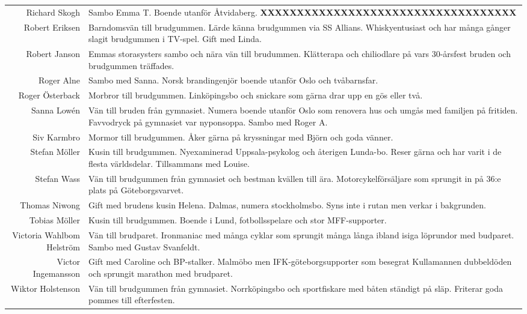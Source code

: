 \documentclass[a5paper]{article}
\begin{document}
\begin{longtable}[l]{N|L}
				Richard Skogh	&	Sambo Emma T. Boende utanför Åtvidaberg.  \textbf{XXXXXXXXXXXXXXXXXXXXXXXXXXXXXXXXXXX}	\\
				Robert Eriksen	&	Barndomsvän till brudgummen. Lärde känna brudgummen via SS Allians. Whiskyentusiast och har många gånger slagit brudgummen i TV-spel. Gift med Linda. 	\\
				Robert Janson	&	Emmas storasysters sambo och nära vän till brudummen. Klätterapa och chiliodlare på vars 30-årsfest bruden och brudgummen träffades.	\\
				Roger Alne	&	Sambo med Sanna. Norsk brandingenjör boende utanför Oslo och tvåbarnsfar.	\\
				Roger Österback	&	Morbror till brudgummen. Linköpingsbo och snickare som gärna drar upp en gös eller två.	\\
				Sanna Lowén	&	Vän till bruden från gymnasiet. Numera boende utanför Oslo som renovera hus och umgås med familjen på fritiden. Favvodryck på gymnasiet var nyponsoppa. Sambo med Roger A.	\\
				Siv Karmbro	&	Mormor till brudgummen. Åker gärna på kryssningar med Björn och goda vänner.	\\
				Stefan Möller	&	Kusin till brudgummen. Nyexaminerad Uppsala-psykolog och återigen Lunda-bo. Reser gärna och har varit i de flesta världsdelar. Tillsammans med Louise.	\\
				Stefan Wass	&	Vän till brudgummen från gymnasiet och bestman kvällen till ära. Motorcykelförsäljare som sprungit in på 36:e plats på Göteborgsvarvet.	\\
				Thomas Niwong	&	Gift med brudens kusin Helena. Dalmas, numera stockholmsbo. Syns inte i rutan men verkar i bakgrunden.	\\
				Tobias Möller	&	Kusin till brudgummen. Boende i Lund, fotbollsspelare och stor MFF-supporter.	\\
				Victoria Wahlbom Helström	&	Vän till brudparet. Ironmaniac med många cyklar som sprungit många långa ibland isiga löprundor med budparet. Sambo med Gustav Svanfeldt.	\\
				Victor Ingemansson	&	Gift med Caroline och BP-stalker. Malmöbo men IFK-göteborgsupporter som besegrat Kullamannen dubbeldöden och sprungit marathon med brudparet.	\\
				Wiktor Holstenson	&	Vän till brudgummen från gymnasiet. Norrköpingsbo och sportfiskare med båten ständigt på släp. Friterar goda pommes till efterfesten. 	\\
		\end{longtable}
	
\end{document}
